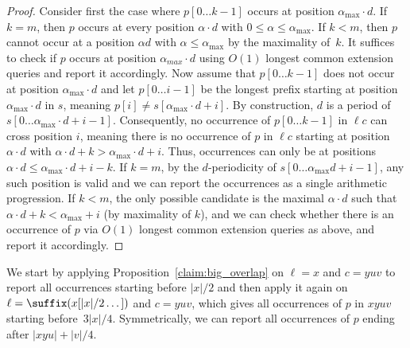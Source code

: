 \begin{proof}
Consider first the case where $p[0 \dots k-1]$ occurs at position $\alpha_{\max} \cdot d$. If $k=m$, then $p$ occurs at every position $\alpha \cdot d$ with $0 \leq \alpha \leq \alpha_{\max}$. If $k<m$, then $p$ cannot occur at a position $\alpha d$ with $\alpha \leq \alpha_{\max}$ by the maximality of~$k$.
It suffices to check if $p$ occurs at position $\alpha_{max} \cdot d$ using $O(1)$ longest common extension queries and report it accordingly. Now assume that $p[0 \dots k-1]$ does not occur at position $\alpha_{\max}\cdot  d$ and let $p[0 \dots i-1]$ be the longest prefix starting at position $\alpha_{\max} \cdot d$ in $s$, meaning $p[i] \neq s[\alpha_{\max} \cdot d +i]$.
By construction, $d$ is a period of $s[0 \dots \alpha_{\max} \cdot d + i-1]$. Consequently, no occurrence of $p[0 \dots k-1]$ in $\ell c$ can cross position $i$, meaning there is no occurrence of $p$ in $\ell c$ starting at position $\alpha \cdot d$ with $\alpha \cdot d + k > \alpha_{\max} \cdot d + i$. Thus, occurrences can only be at positions $\alpha \cdot d \leq \alpha_{\max} \cdot d +i-k$. If $k=m$, by the $d$-periodicity of $s[0 \dots \alpha_{\max} d + i-1]$, any such position is valid and we can report the occurrences as a single arithmetic progression.
If $k<m$, the only possible candidate is the maximal $\alpha \cdot d$ such that $\alpha \cdot d +k < \alpha_{\max} +i $ (by maximality of $k$), and we can check whether there is an occurrence of $p$ via $O(1)$ longest common extension queries as above, and report it accordingly.
\end{proof}

We start by applying Proposition~\ref{claim:big_overlap} on $\ell = x$ and $c = yuv$ to report all occurrences starting before $|x|/2$ and then apply it again on $\ell = \suffix(x[|x|/2 \dots])$ and $c = yuv$, which gives all occurrences of $p$ in $xyuv$ starting before~$3|x|/4$. Symmetrically, we can report all occurrences of $p$ ending after $|xyu| + |v|/4$. 

